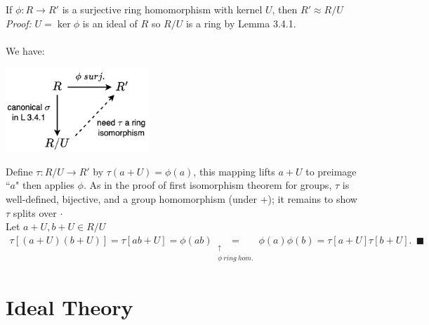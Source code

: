 \begin{theorem} 
If $\phi: R \rightarrow R'$ is a surjective ring homomorphism with kernel $U$, then $R' \approx R/U$ \steezybreak\\
\textit{Proof:} $U=\ker \phi$ is an ideal of $R$ so $R/U$ is a ring by Lemma 3.4.1. \\  \\
We have: \\
\begin{center}
    \includegraphics[width=0.4\textwidth]{Figures/Ring_1st_iso_black.png}
\end{center}
Define $\tau: R/U \rightarrow R'$ by $\tau(a+U)= \phi(a)$, this mapping lifts $a+U$ to preimage ``$a$" then applies $\phi$. As in the proof of first isomorphism theorem for groups, $\tau$ is well-defined, bijective, and a group homomorphism (under $+$); it remains to show $\tau$ splits over $\cdot$ \steezybreak\\
Let $a+U, b+U \in R/U$
\begin{align}
    \tau[(a+U)(b+U)]=\tau[ab+U]=\phi(ab)\underset{\substack{\uparrow \\ \phi \ ring \ hom.}}{=} \phi(a)\phi(b) =\tau[a+U]\tau[b+U]. \ \  \blacksquare \nonumber
\end{align}
    
\end{theorem}

\section{Ideal Theory}

